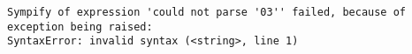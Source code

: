 \begin{verbatim}
Sympify of expression 'could not parse '03'' failed, because of exception being raised:
SyntaxError: invalid syntax (<string>, line 1)
\end{verbatim}
